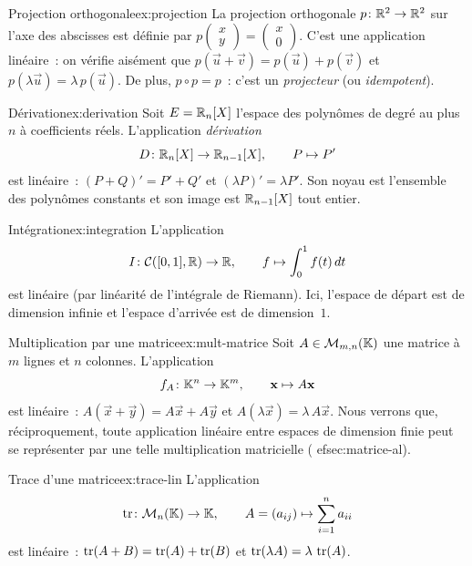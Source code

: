 \begin{example}{Projection orthogonale}{ex:projection}
  La projection orthogonale $p\colon{\mathbb{R}}^2\to{\mathbb{R}}^2$ sur l'axe des abscisses
  est définie par $p\begin{pmatrix}x\\y\end{pmatrix}
  =\begin{pmatrix}x\\0\end{pmatrix}$. C'est une application linéaire~:
  on vérifie aisément que $p(\vec{u}+\vec{v})=p(\vec{u})+p(\vec{v})$ et
  $p(\lambda\vec{u})=\lambda\,p(\vec{u})$. De plus, $p\circ p=p$~: c'est
  un \emph{projecteur} (ou \emph{idempotent}).
\end{example}

\begin{example}{Dérivation}{ex:derivation}
  Soit $E={\mathbb{R}}_n[X]$ l'espace des polynômes de degré au plus~$n$ à
  coefficients réels. L'application \emph{dérivation}
  \[
    D\colon{\mathbb{R}}_n[X]\to{\mathbb{R}}_{n-1}[X],\qquad P\mapsto P'
  \]
  est linéaire~: $(P+Q)'=P'+Q'$ et $(\lambda P)'=\lambda P'$. Son noyau
  est l'ensemble des polynômes constants et son image est ${\mathbb{R}}_{n-1}[X]$
  tout entier.
\end{example}

\begin{example}{Intégration}{ex:integration}
  L'application
  \[
    I\colon\mathcal{C}([0,1],{\mathbb{R}})\to{\mathbb{R}},\qquad f\mapsto\int_0^1 f(t)\,dt
  \]
  est linéaire (par linéarité de l'intégrale de Riemann). Ici, l'espace
  de départ est de dimension infinie et l'espace d'arrivée est de
  dimension~$1$.
\end{example}

\begin{example}{Multiplication par une matrice}{ex:mult-matrice}
  Soit $A\in\mathcal{M}_{m,n}({\mathbb{K}})$ une matrice à $m$ lignes et $n$ colonnes.
  L'application
  \[
    f_A\colon{\mathbb{K}}^n\to{\mathbb{K}}^m,\qquad \mathbf{x}\mapsto A\mathbf{x}
  \]
  est linéaire~: $A(\vec{x}+\vec{y})=A\vec{x}+A\vec{y}$ et
  $A(\lambda\vec{x})=\lambda\,A\vec{x}$. Nous verrons que,
  réciproquement, toute application linéaire entre espaces de dimension
  finie peut se représenter par une telle multiplication matricielle
  (
ef{sec:matrice-al}).
\end{example}

\begin{example}{Trace d'une matrice}{ex:trace-lin}
  L'application
  \[
    \operatorname{tr}\colon\mathcal{M}_n({\mathbb{K}})\to{\mathbb{K}},\qquad A=(a_{ij})\mapsto\sum_{i=1}^n a_{ii}
  \]
  est linéaire~: $\operatorname{tr}(A+B)=\operatorname{tr}(A)+\operatorname{tr}(B)$ et
  $\operatorname{tr}(\lambda A)=\lambda\,\operatorname{tr}(A)$.
\end{example}

